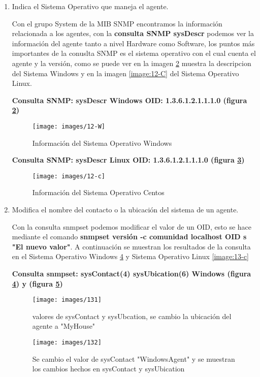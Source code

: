 \begin{enumerate}
\textbf{Consulta SNMP: egpInMsgs Centos OID: 1.3.6.1.2.1.8.1.0 (figura \ref{image:11-C})}
\FloatBarrier
\begin{figure}[htbp!]
		\centering
	\texttt{[image: images/11-C]}
		\caption{S.O Centos no cuenta con mensajes EGP}		\label{image:11-C}
\end{figure}
\FloatBarrier

\item Indica el Sistema Operativo que maneja el agente.

Con el grupo System de  la MIB SNMP encontramos la información relacionada a los agentes, con la \textbf{consulta SNMP sysDescr} podemos ver la información del agente tanto a nivel Hardware como Software, los puntos más importantes de la conuslta SNMP es el sistema operativo con el cual cuenta el agente y la versión, como se puede ver en la imagen  \ref{image:12-W}  muestra la descripcion del Sistema Windows y en la imagen   \ref{image:12-C}   del Sistema Operativo Linux.
 
 

\textbf{Consulta SNMP: sysDescr Windows OID: 1.3.6.1.2.1.1.1.0 (figura \ref{image:12-W})}
\FloatBarrier
\begin{figure}[htbp!]
		\centering
	\texttt{[image: images/12-W]}
		\caption{Información del Sistema Operativo Windows}		\label{image:12-W}
\end{figure}
\FloatBarrier

\textbf{Consulta SNMP: sysDescr Linux OID: 1.3.6.1.2.1.1.1.0 (figura \ref{image:12-c})}
\FloatBarrier
\begin{figure}[htbp!]
		\centering
	\texttt{[image: images/12-c]}
		\caption{Información del Sistema Operativo Centos}		\label{image:12-c}
\end{figure}
\FloatBarrier


\item Modifica el nombre del contacto o la ubicación del sistema de un agente.

Con la consulta snmpset podemos modificar el valor de un OID, esto se hace mediante el comando \textbf{snmpset versión -c comunidad localhost OID s "El nuevo valor"}. A continuación se muestran los resultados de la consulta en el Sistema Operativo Windows  \ref{image:131}  y Sistema Operativo Linux  \ref{image:13-c}



\textbf{Consulta snmpset: sysContact(4) sysUbication(6) Windows (figura   \ref{image:131}) y   (figura  \ref{image:132})}
\FloatBarrier
\begin{figure}[htbp!]
		\centering
	\texttt{[image: images/131]}
		\caption{valores de sysContact y sysUbcation, se cambio la ubicación del agente a "MyHouse"}		\label{image:131}
\end{figure}
\begin{figure}[htbp!]
		\centering
	\texttt{[image: images/132]}
		\caption{Se cambio el valor de sysContact "WindowsAgent" y se muestran los cambios hechos en sysContact y sysUbication}		\label{image:132}
\end{figure}
\FloatBarrier



\end{enumerate}
